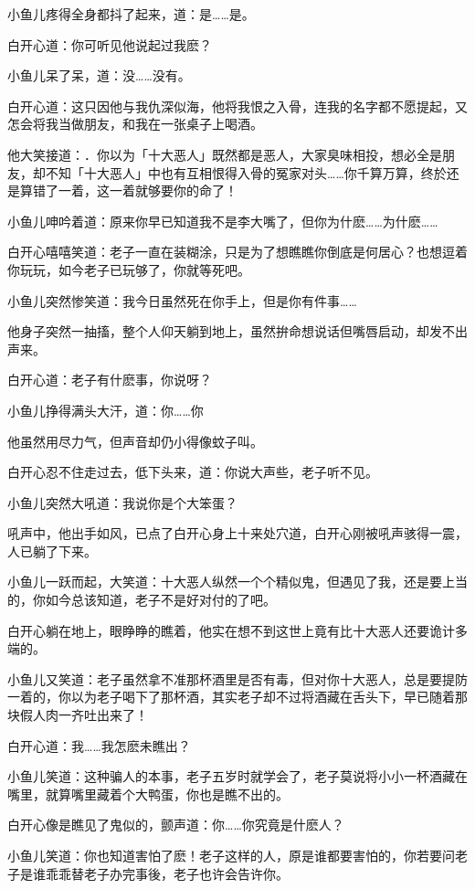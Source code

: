 \documentclass[12pt,oneside]{book}
\begin{document}
小鱼儿疼得全身都抖了起来，道：是\ldots\ldots 是。

白开心道：你可听见他说起过我麽？

小鱼儿呆了呆，道：没\ldots\ldots 没有。

白开心道：这只因他与我仇深似海，他将我恨之入骨，连我的名字都不愿提起，又怎会将我当做朋友，和我在一张桌子上喝酒。

他大笑接道：．你以为「十大恶人」既然都是恶人，大家臭味相投，想必全是朋友，却不知「十大恶人」中也有互相恨得入骨的冤家对头\ldots\ldots 你千算万算，终於还是算错了一着，这一着就够要你的命了！

小鱼儿呻吟着道：原来你早已知道我不是李大嘴了，但你为什麽\ldots\ldots 为什麽\ldots\ldots{}

白开心嘻嘻笑道：老子一直在装糊涂，只是为了想瞧瞧你倒底是何居心？也想逗着你玩玩，如今老子已玩够了，你就等死吧。

小鱼儿突然惨笑道：我今日虽然死在你手上，但是你有件事\ldots\ldots{}

他身子突然一抽搐，整个人仰天躺到地上，虽然拚命想说话但嘴唇启动，却发不出声来。

白开心道：老子有什麽事，你说呀？

小鱼儿挣得满头大汗，道：你\ldots\ldots 你

他虽然用尽力气，但声音却仍小得像蚊子叫。

白开心忍不住走过去，低下头来，道：你说大声些，老子听不见。

小鱼儿突然大吼道：我说你是个大笨蛋？

吼声中，他出手如风，已点了白开心身上十来处穴道，白开心刚被吼声骇得一震，人已躺了下来。

小鱼儿一跃而起，大笑道：十大恶人纵然一个个精似鬼，但遇见了我，还是要上当的，你如今总该知道，老子不是好对付的了吧。

白开心躺在地上，眼睁睁的瞧着，他实在想不到这世上竟有比十大恶人还要诡计多端的。

小鱼儿又笑道：老子虽然拿不准那杯酒里是否有毒，但对你十大恶人，总是要提防一着的，你以为老子喝下了那杯酒，其实老子却不过将酒藏在舌头下，早已随着那块假人肉一齐吐出来了！

白开心道：我\ldots\ldots 我怎麽未瞧出？

小鱼儿笑道：这种骗人的本事，老子五岁时就学会了，老子莫说将小小一杯酒藏在嘴里，就算嘴里藏着个大鸭蛋，你也是瞧不出的。

白开心像是瞧见了鬼似的，颤声道：你\ldots\ldots 你究竟是什麽人？

小鱼儿笑道：你也知道害怕了麽！老子这样的人，原是谁都要害怕的，你若要问老子是谁乖乖替老子办完事後，老子也许会告许你。
\end{document}
